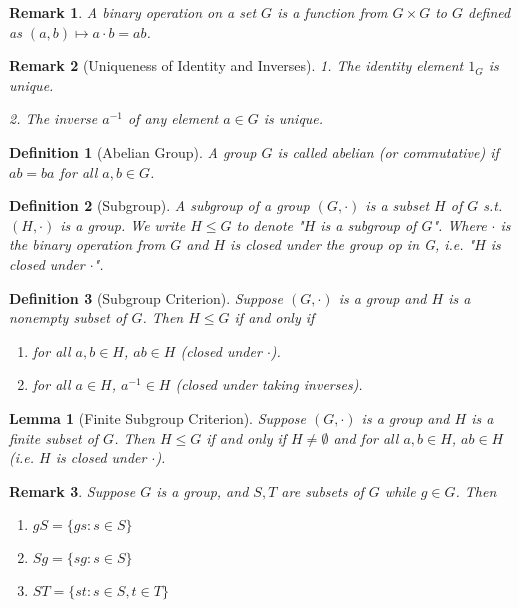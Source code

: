 \documentclass[12pt]{article}
\newtheorem{definition}{Definition}[section]
\newtheorem{lemma}{Lemma}[section]
\newtheorem{remark}{Remark}[section]
\begin{document}
\begin{remark} 
    A binary operation on a set $G$ is a function from $G \times G$ to $G$ defined as $(a,b) \mapsto a \cdot b = ab$.
\end{remark}

\begin{remark}[Uniqueness of Identity and Inverses]
        \item 1. The identity element $1_G$ is unique.
        \item 2. The inverse $a^{-1}$ of any element $a \in G$ is unique.
\end{remark}

\begin{definition}[Abelian Group]
A group $G$ is called \emph{abelian} (or commutative) if $ab = ba$ for all $a,b \in G$.
\end{definition}

\begin{definition}[Subgroup]
A subgroup of a group $(G, \cdot)$ is a subset $H$ of $G$ s.t. $(H, \cdot)$ is a group. We write $H\leq G$ to denote "$H$ is a subgroup of $G$". Where $\cdot$ is the binary operation from $G$ and $H$ is closed under the group op in G, i.e. "$H$ is closed under $\cdot$".
\end{definition}

\begin{definition}[Subgroup Criterion]
    Suppose $(G, \cdot)$ is a group and $H$ is a nonempty subset of $G$. Then $H \leq G$ if and only if 
    \begin{enumerate}
        \item for all $a,b \in H$, $ab \in H$ (closed under $\cdot$).
        \item for all $a \in H$, $a^{-1} \in H$ (closed under taking inverses).
    \end{enumerate}
\end{definition}

\begin{lemma}[Finite Subgroup Criterion]
Suppose $(G, \cdot) $ is a group and $H$ is a finite subset of $G$. Then $H \leq G$ if and only if $H \neq \emptyset$ and for all $a,b \in H$, $ab \in H$ (i.e. $H$ is closed under $\cdot$).
\end{lemma}

\begin{remark}
    Suppose $G$ is a group, and $S, T$ are subsets of $G$ while $g \in G$. Then
    \begin{enumerate}
        \item $gS = \{ gs : s \in S \}$
        \item $Sg = \{ sg : s \in S \}$
        \item $ST = \{ st : s \in S, t \in T \}$
    \end{enumerate}
\end{remark}
\end{document}
